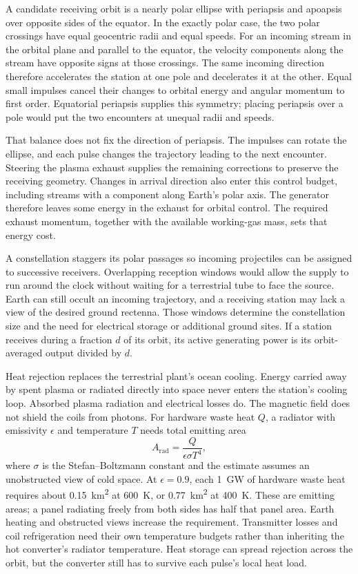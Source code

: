 \documentclass{article}
\begin{document}
A candidate receiving orbit is a nearly polar ellipse with periapsis and apoapsis over opposite sides of the equator. In the exactly polar case, the two polar crossings have equal geocentric radii and equal speeds. For an incoming stream in the orbital plane and parallel to the equator, the velocity components along the stream have opposite signs at those crossings. The same incoming direction therefore accelerates the station at one pole and decelerates it at the other. Equal small impulses cancel their changes to orbital energy and angular momentum to first order. Equatorial periapsis supplies this symmetry; placing periapsis over a pole would put the two encounters at unequal radii and speeds.

That balance does not fix the direction of periapsis. The impulses can rotate the ellipse, and each pulse changes the trajectory leading to the next encounter. Steering the plasma exhaust supplies the remaining corrections to preserve the receiving geometry. Changes in arrival direction also enter this control budget, including streams with a component along Earth's polar axis. The generator therefore leaves some energy in the exhaust for orbital control. The required exhaust momentum, together with the available working-gas mass, sets that energy cost.

A constellation staggers its polar passages so incoming projectiles can be assigned to successive receivers. Overlapping reception windows would allow the supply to run around the clock without waiting for a terrestrial tube to face the source. Earth can still occult an incoming trajectory, and a receiving station may lack a view of the desired ground rectenna. Those windows determine the constellation size and the need for electrical storage or additional ground sites. If a station receives during a fraction $d$ of its orbit, its active generating power is its orbit-averaged output divided by $d$.

Heat rejection replaces the terrestrial plant's ocean cooling. Energy carried away by spent plasma or radiated directly into space never enters the station's cooling loop. Absorbed plasma radiation and electrical losses do. The magnetic field does not shield the coils from photons. For hardware waste heat $Q$, a radiator with emissivity $\epsilon$ and temperature $T$ needs total emitting area
\begin{equation}
    A_{\mathrm{rad}} = \frac{Q}{\epsilon\sigma T^4},\label{eq:orbital_radiator_area}
\end{equation}
where $\sigma$ is the Stefan--Boltzmann constant and the estimate assumes an unobstructed view of cold space. At $\epsilon = 0.9$, each \SI{1}{\giga\watt} of hardware waste heat requires about \SI{0.15}{\kilo\meter\squared} at \SI{600}{\kelvin}, or \SI{0.77}{\kilo\meter\squared} at \SI{400}{\kelvin}. These are emitting areas; a panel radiating freely from both sides has half that panel area. Earth heating and obstructed views increase the requirement. Transmitter losses and coil refrigeration need their own temperature budgets rather than inheriting the hot converter's radiator temperature. Heat storage can spread rejection across the orbit, but the converter still has to survive each pulse's local heat load.
\end{document}
